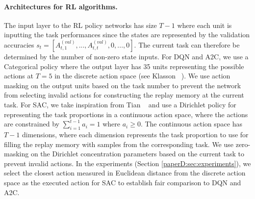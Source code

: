 \paragraph{Architectures for RL algorithms.}
The input layer to the RL policy networks has size $T-1$ where each unit is inputting the task performances since the states are represented by the validation accuracies $s_t = [A_{t, 1}^{(val)}, ..., A_{t, t}^{(val)}, 0, ..., 0]$. The current task can therefore be determined by the number of non-zero state inputs. For DQN and A2C, we use a Categorical policy where the output layer has 35 units representing the possible actions at $T=5$ in the discrete action space (see Klasson \etal~). We use action masking on the output units based on the task number to prevent the network from selecting invalid actions for constructing the replay memory at the current task. 
For SAC, we take inspiration from Tian \etal~ and use a Dirichlet policy for representing the task proportions in a continuous action space, where the actions are constrained by $\sum_{i=1}^{t-1} a_i = 1$ where $a_i \geq 0$. The continuous action space has $T-1$ dimensions, where each dimension represents the task proportion to use for filling the replay memory with samples from the corresponding task. We use zero-masking on the Dirichlet concentration parameters based on the current task to prevent invalid actions. In the experiments (Section \ref{paperD:sec:experiments}), we select the closest action measured in Euclidean distance from the discrete action space as the executed action for SAC to establish fair comparison to DQN and A2C. 


